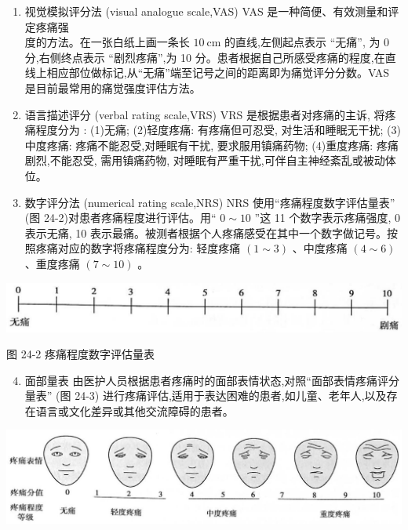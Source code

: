 \documentclass[10pt]{article}
\begin{document}
\begin{enumerate}
  \item 视觉模拟评分法 (visual analogue scale,VAS) VAS 是一种简便、有效测量和评定疼痛强\\
度的方法。在一张白纸上画一条长 $10 \mathrm{~cm}$ 的直线,左侧起点表示 “无痛”, 为 0 分,右侧终点表示 “剧烈疼痛”,为 10 分。患者根据自己所感受疼痛的程度,在直线上相应部位做标记,从“无痛”端至记号之间的距离即为痛觉评分分数。VAS 是目前最常用的痛觉强度评估方法。

  \item 语言描述评分 (verbal rating scale,VRS) VRS 是根据患者对疼痛的主诉, 将疼痛程度分为 : (1)无痛; (2)轻度疼痛: 有疼痛但可忍受, 对生活和睡眠无干扰; (3)中度疼痛: 疼痛不能忍受,对睡眠有干扰, 要求服用镇痛药物; (4)重度疼痛: 疼痛剧烈,不能忍受, 需用镇痛药物, 对睡眠有严重干扰,可伴自主神经紊乱或被动体位。

  \item 数字评分法 (numerical rating scale,NRS) NRS 使用“疼痛程度数字评估量表” (图 24-2)对患者疼痛程度进行评估。用“ $0 \sim 10$ ”这 11 个数字表示疼痛强度, 0 表示无痛, 10 表示最痛。被测者根据个人疼痛感受在其中一个数字做记号。按照疼痛对应的数字将疼痛程度分为: 轻度疼痛 $(1 \sim 3)$ 、中度疼痛 $(4 \sim 6)$ 、重度疼痛 $(7 \sim 10)$ 。

\end{enumerate}

\begin{center}
\includegraphics[max width=\textwidth]{2024_07_09_002a177993bd97d1d6d7g-250}
\end{center}

图 24-2 疼痛程度数字评估量表

\begin{enumerate}
  \setcounter{enumi}{3}
  \item 面部量表 由医护人员根据患者疼痛时的面部表情状态,对照“面部表情疼痛评分量表” (图 24-3) 进行疼痛评估,适用于表达困难的患者,如儿童、老年人,以及存在语言或文化差异或其他交流障碍的患者。
\end{enumerate}

\begin{center}
\includegraphics[max width=\textwidth]{2024_07_09_002a177993bd97d1d6d7g-250(1)}
\end{center}
\end{document}
